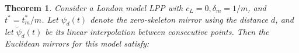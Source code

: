 \documentclass[12pt]{article}
\newtheorem{thm}{Theorem}
\theoremstyle{definition}
\begin{document}
\begin{thm} \label{thm:London_main}
Consider a London model LPP with $c_L=0, \delta_m=1/m$, and $t^*=t_m^*/m$. Let $\psi_{d}(t)$ denote the zero-skeleton mirror using the distance $d$, and let $\tilde{\psi}_d(t)$ be its linear interpolation between consecutive points. Then the Euclidean mirrors for this model satisfy:
\begin{itemize}


\end{itemize}
\end{thm}
\end{document}
